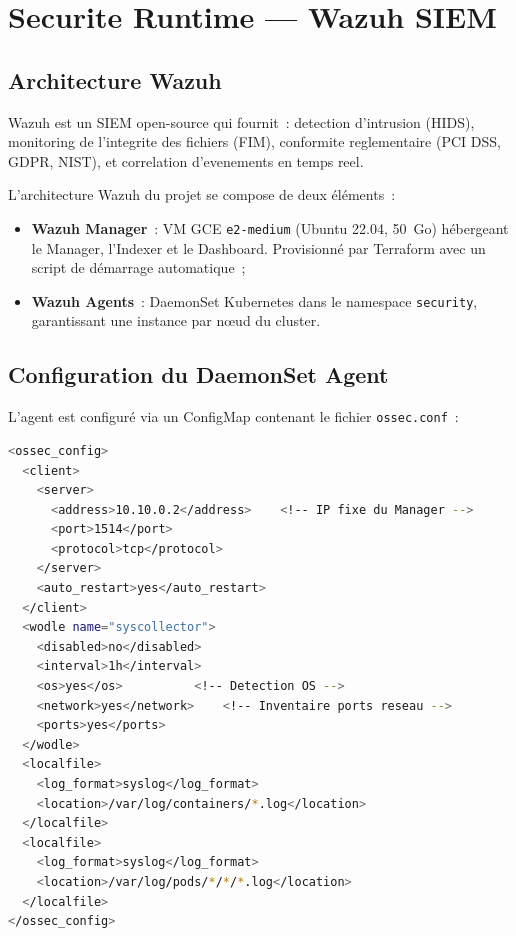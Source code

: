 \section{Securite Runtime --- Wazuh SIEM}

\subsection{Architecture Wazuh}
Wazuh est un SIEM open-source qui fournit~: detection d'intrusion (HIDS), monitoring de
l'integrite des fichiers (FIM), conformite reglementaire (PCI DSS, GDPR, NIST), et
correlation d'evenements en temps reel.

L'architecture Wazuh du projet se compose de deux éléments~:
\begin{itemize}
  \item \textbf{Wazuh Manager}~: VM GCE \texttt{e2-medium} (Ubuntu 22.04, 50~Go) hébergeant
        le Manager, l'Indexer et le Dashboard. Provisionné par Terraform avec un script de
        démarrage automatique~;
  \item \textbf{Wazuh Agents}~: DaemonSet Kubernetes dans le namespace \texttt{security},
        garantissant une instance par nœud du cluster.
\end{itemize}

\subsection{Configuration du DaemonSet Agent}

L'agent est configuré via un ConfigMap contenant le fichier \texttt{ossec.conf}~:

\begin{lstlisting}[language=bash, caption=Configuration Wazuh Agent (ConfigMap ossec.conf)]
<ossec_config>
  <client>
    <server>
      <address>10.10.0.2</address>    <!-- IP fixe du Manager -->
      <port>1514</port>
      <protocol>tcp</protocol>
    </server>
    <auto_restart>yes</auto_restart>
  </client>
  <wodle name="syscollector">
    <disabled>no</disabled>
    <interval>1h</interval>
    <os>yes</os>          <!-- Detection OS -->
    <network>yes</network>    <!-- Inventaire ports reseau -->
    <ports>yes</ports>
  </wodle>
  <localfile>
    <log_format>syslog</log_format>
    <location>/var/log/containers/*.log</location>
  </localfile>
  <localfile>
    <log_format>syslog</log_format>
    <location>/var/log/pods/*/*/*.log</location>
  </localfile>
</ossec_config>
\end{lstlisting}

